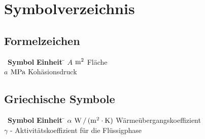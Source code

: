 
\chapter*{Symbolverzeichnis}\thispagestyle{fancy}

\section*{Formelzeichen}

\begin{tabbing}
\ \= \textbf{Symbol} \hspace{0.5cm} \= \textbf{Einheit} \hspace{1.5cm} \= \kill
\> $A$ \> $\rm{m^{2}}$ \> Fläche \\
\> $a$ \> $\rm{MPa}$ \> Kohäsionsdruck \\
\end{tabbing}

\section*{Griechische Symbole}

\begin{tabbing}
\ \= \textbf{Symbol} \hspace{0.5cm} \= \textbf{Einheit} \hspace{1.5cm} \= \kill
\> $\alpha$ \> $\rm{W\,/\,(m^{2} \cdot K)}$ \> Wärmeübergangskoeffizient\\
\> $\gamma$ \> - \> Aktivitätskoeffizient für die Flüssigphase \\
\end{tabbing}